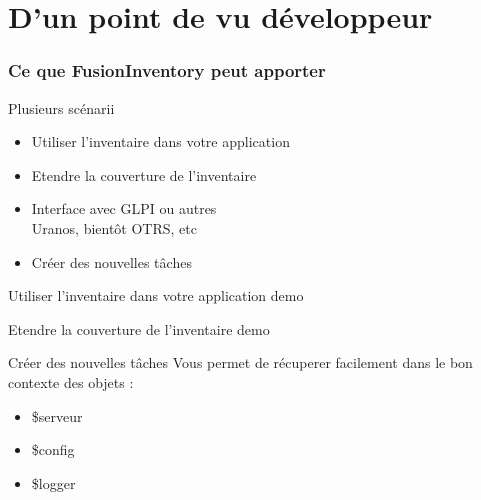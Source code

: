 \documentclass{beamer}
\begin{document}
\section{D'un point de vu développeur}

\begin{frame}
    \frametitle{Ce que FusionInventory peut apporter}

    \begin{block}{Plusieurs scénarii}
        \begin{itemize}
            \item Utiliser l'inventaire dans votre application
            \item Etendre la couverture de l'inventaire
            \item Interface avec GLPI ou autres \\
            \small{Uranos, bientôt OTRS, etc}
            \item Créer des nouvelles tâches
        \end{itemize}
    \end{block}

\end{frame}

\begin{frame}

    \begin{block}{Utiliser l'inventaire dans votre application}
    demo
    \end{block}

\end{frame}


\begin{frame}

    \begin{block}{Etendre la couverture de l'inventaire}
    demo
    \end{block}

\end{frame}

\begin{frame}

    \begin{block}{Créer des nouvelles tâches}
    Vous permet de récuperer facilement dans le bon contexte des objets :
    \begin{itemize}
      \item \$serveur
      \item \$config
      \item \$logger 
    \end{itemize}
    \end{block}

\end{frame}
\end{document}
